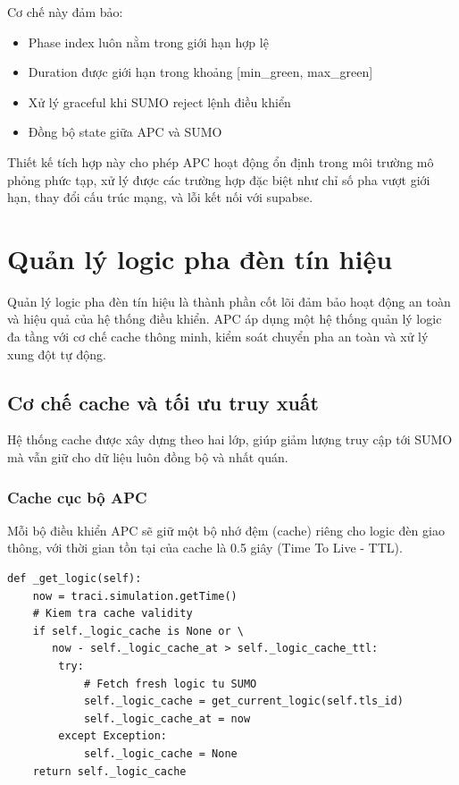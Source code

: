 Cơ chế này đảm bảo:
\begin{itemize}
    \item Phase index luôn nằm trong giới hạn hợp lệ
    \item Duration được giới hạn trong khoảng [min\_green, max\_green]
    \item Xử lý graceful khi SUMO reject lệnh điều khiển
    \item Đồng bộ state giữa APC và SUMO
\end{itemize}
Thiết kế tích hợp này cho phép APC hoạt động ổn định trong môi trường mô phỏng phức tạp, xử lý được các trường hợp đặc biệt như chỉ số pha vượt giới hạn, thay đổi cấu trúc mạng, và lỗi kết nối với supabse.
\section{Quản lý logic pha đèn tín hiệu}

Quản lý logic pha đèn tín hiệu là thành phần cốt lõi đảm bảo hoạt động an toàn và hiệu quả của hệ thống điều khiển. APC áp dụng một hệ thống quản lý logic đa tầng với cơ chế cache thông minh, kiểm soát chuyển pha an toàn và xử lý xung đột tự động.

\subsection{Cơ chế cache và tối ưu truy xuất}

Hệ thống cache được xây dựng theo hai lớp, giúp giảm lượng truy cập tới SUMO mà vẫn giữ cho dữ liệu luôn đồng bộ và nhất quán.
\subsubsection{Cache cục bộ APC}

Mỗi bộ điều khiển APC sẽ giữ một bộ nhớ đệm (cache) riêng cho logic đèn giao thông, với thời gian tồn tại của cache là 0.5 giây (Time To Live - TTL).

\begin{lstlisting}[style=py, caption={Implementation của logic cache cục bộ}]
def _get_logic(self):
    now = traci.simulation.getTime()
    # Kiem tra cache validity
    if self._logic_cache is None or \
       now - self._logic_cache_at > self._logic_cache_ttl:
        try:
            # Fetch fresh logic tu SUMO
            self._logic_cache = get_current_logic(self.tls_id)
            self._logic_cache_at = now
        except Exception:
            self._logic_cache = None
    return self._logic_cache
\end{lstlisting}

